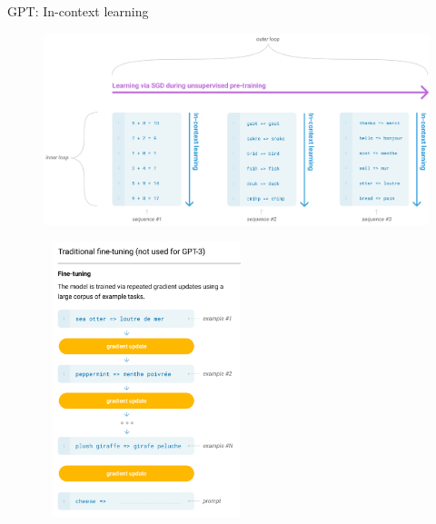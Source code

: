 \begin{vbframe}{GPT: In-context learning}

\vfill

\begin{figure}
		\centering
		\includegraphics[clip,trim=200px 0 0 0,width=\linewidth]{figure/twotypesoflearning.png}
	\end{figure}


\end{vbframe}



\begin{vbframe}

	\begin{figure}
		\centering
		\includegraphics[height=8cm,width=6cm]{figure/gptnofinetuning.png}
	\end{figure}

\vfill

\end{vbframe}


